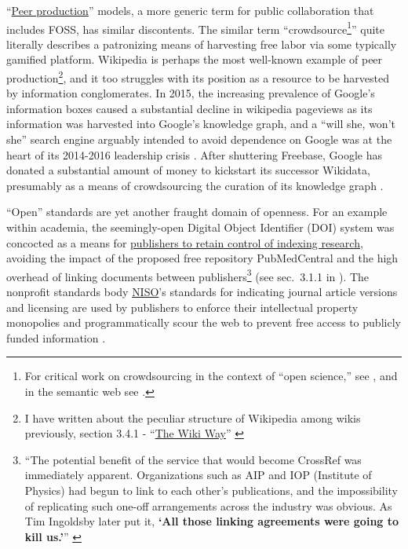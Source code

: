 ``\href{https://en.wikipedia.org/wiki/Peer_production}{Peer
production}'' models, a more generic term for public collaboration that
includes FOSS, has similar discontents. The similar term
``crowdsource\footnote{For critical work on crowdsourcing in the context
  of ``open science,'' see \cite{mirowskiFutureOpenScience2018} ,
  and in the semantic web see \cite{allhutterWorkingOntologistsHighQuality2019} .}'' quite literally
describes a patronizing means of harvesting free labor via some
typically gamified platform. Wikipedia is perhaps the most well-known
example of peer production\footnote{I have written about the peculiar
  structure of Wikipedia among wikis previously, section 3.4.1 -
  ``\href{https://jon-e.net/infrastructure/\#the-wiki-way}{The Wiki
  Way}'' \cite{saundersDecentralizedInfrastructureNeuro2022} },
and it too struggles with its position as a resource to be harvested by
information conglomerates. In 2015, the increasing prevalence of
Google's information boxes caused a substantial decline in wikipedia
pageviews \cite{UserTalkJimbo2015, hinkisGoogleSteals5502015}  as
its information was harvested into Google's knowledge graph, and a
``will she, won't she'' search engine arguably intended to avoid
dependence on Google was at the heart of its 2014-2016 leadership crisis
\cite{whiteWikimediaTimelineEvents2016, buetlerSearchDestroyKnowledge2016} . After shuttering Freebase,
Google has donated a substantial amount of money to kickstart its
successor \cite{pellissiertanonFreebaseWikidataGreat2016} 
Wikidata, presumably as a means of crowdsourcing the curation of its
knowledge graph \cite{wikimediameta-wikiGoogleMeta, GoogleStakeWikidata2019, vrandecicWikidataFreeCollaborative2014} .

``Open'' standards are yet another fraught domain of openness. For an
example within academia, the seemingly-open Digital Object Identifier
(DOI) system was concocted as a means for
\href{https://jon-e.net/infrastructure/\#seemingly-prosocial-protocols-can-be-used-by-industries-to-preem}{publishers
to retain control of indexing research}, avoiding the impact of the
proposed free repository PubMedCentral and the high overhead of linking
documents between publishers\footnote{``The potential benefit of the
  service that would become CrossRef was immediately apparent.
  Organizations such as AIP and IOP (Institute of Physics) had begun to
  link to each other's publications, and the impossibility of
  replicating such one-off arrangements across the industry was obvious.
  As Tim Ingoldsby later put it, \textbf{`All those linking agreements
  were going to kill us.'}'' \cite{crossrefFormationCrossRefShort2009} } (see sec.~3.1.1 in \cite{saundersDecentralizedInfrastructureNeuro2022} ). The nonprofit
standards body \href{https://www.niso.org}{NISO}'s standards for
indicating journal article versions \cite{nisoRP82008JournalArticle2008}  and licensing \cite{nisoRP222021AccessLicense2021}  are used by publishers to enforce
their intellectual property monopolies and programmatically scour the
web to prevent free access to publicly funded information \cite{carpenterNewArticleSharing2021} .

